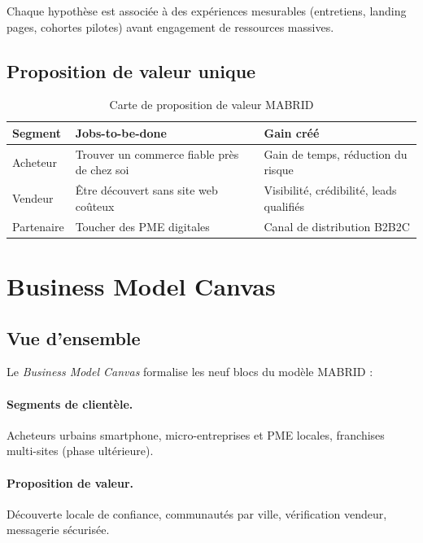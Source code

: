 Chaque hypothèse est associée à des expériences mesurables (entretiens, landing pages, cohortes pilotes) avant engagement de ressources massives.

\subsection{Proposition de valeur unique}

\begin{table}[H]
  \centering
  \caption{Carte de proposition de valeur MABRID}
  \label{tab:value-prop-entrepreneur}
  \begin{tabularx}{\textwidth}{@{}lXX@{}}
    \toprule
    \textbf{Segment} & \textbf{Jobs-to-be-done} & \textbf{Gain créé} \\
    \midrule
    Acheteur & Trouver un commerce fiable près de chez soi & Gain de temps, réduction du risque \\
    Vendeur & Être découvert sans site web coûteux & Visibilité, crédibilité, leads qualifiés \\
    Partenaire & Toucher des PME digitales & Canal de distribution B2B2C \\
    \bottomrule
  \end{tabularx}
\end{table}

\section{Business Model Canvas}

\subsection{Vue d'ensemble}

Le \emph{Business Model Canvas} \parencite{osterwalder2010business} formalise les neuf blocs du modèle MABRID :

\paragraph{Segments de clientèle.} Acheteurs urbains smartphone, micro-entreprises et PME locales, franchises multi-sites (phase ultérieure).

\paragraph{Proposition de valeur.} Découverte locale de confiance, communautés par ville, vérification vendeur, messagerie sécurisée.

